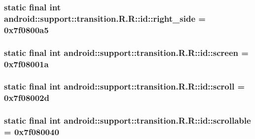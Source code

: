 \hypertarget{classandroid_1_1support_1_1transition_1_1_r_1_1id_e6461b20e7bf573b56e9e4c48bb638bf}{
\subsubsection[{right\_\-side}]{\setlength{\rightskip}{0pt plus 5cm}static final int android::support::transition.R.R::id::right\_\-side = 0x7f0800a5}}
\label{classandroid_1_1support_1_1transition_1_1_r_1_1id_e6461b20e7bf573b56e9e4c48bb638bf}


\hypertarget{classandroid_1_1support_1_1transition_1_1_r_1_1id_123469a02e9e9577fe72250857cb5e31}{
\subsubsection[{screen}]{\setlength{\rightskip}{0pt plus 5cm}static final int android::support::transition.R.R::id::screen = 0x7f08001a}}
\label{classandroid_1_1support_1_1transition_1_1_r_1_1id_123469a02e9e9577fe72250857cb5e31}


\hypertarget{classandroid_1_1support_1_1transition_1_1_r_1_1id_f00f2c205b294e1022e793e9d319a3aa}{
\subsubsection[{scroll}]{\setlength{\rightskip}{0pt plus 5cm}static final int android::support::transition.R.R::id::scroll = 0x7f08002d}}
\label{classandroid_1_1support_1_1transition_1_1_r_1_1id_f00f2c205b294e1022e793e9d319a3aa}


\hypertarget{classandroid_1_1support_1_1transition_1_1_r_1_1id_16debf893dc4c4d1675d614fc4a70eef}{
\subsubsection[{scrollable}]{\setlength{\rightskip}{0pt plus 5cm}static final int android::support::transition.R.R::id::scrollable = 0x7f080040}}
\label{classandroid_1_1support_1_1transition_1_1_r_1_1id_16debf893dc4c4d1675d614fc4a70eef}


